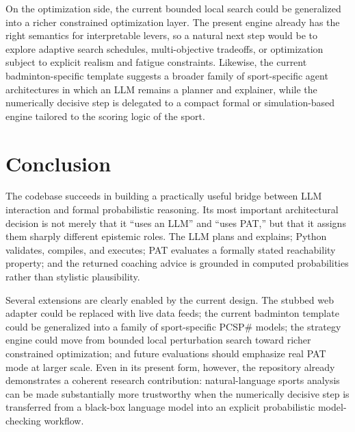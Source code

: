 \documentclass{article}
\begin{document}
On the optimization side, the current bounded local search could be generalized into a richer constrained optimization layer. The present engine already has the right semantics for interpretable levers, so a natural next step would be to explore adaptive search schedules, multi-objective tradeoffs, or optimization subject to explicit realism and fatigue constraints. Likewise, the current badminton-specific template suggests a broader family of sport-specific agent architectures in which an LLM remains a planner and explainer, while the numerically decisive step is delegated to a compact formal or simulation-based engine tailored to the scoring logic of the sport.

\section{Conclusion}
The codebase succeeds in building a practically useful bridge between LLM interaction and formal probabilistic reasoning. Its most important architectural decision is not merely that it ``uses an LLM'' and ``uses PAT,'' but that it assigns them sharply different epistemic roles. The LLM plans and explains; Python validates, compiles, and executes; PAT evaluates a formally stated reachability property; and the returned coaching advice is grounded in computed probabilities rather than stylistic plausibility.

Several extensions are clearly enabled by the current design. The stubbed web adapter could be replaced with live data feeds; the current badminton template could be generalized into a family of sport-specific PCSP\# models; the strategy engine could move from bounded local perturbation search toward richer constrained optimization; and future evaluations should emphasize real PAT mode at larger scale. Even in its present form, however, the repository already demonstrates a coherent research contribution: natural-language sports analysis can be made substantially more trustworthy when the numerically decisive step is transferred from a black-box language model into an explicit probabilistic model-checking workflow.
\end{document}
